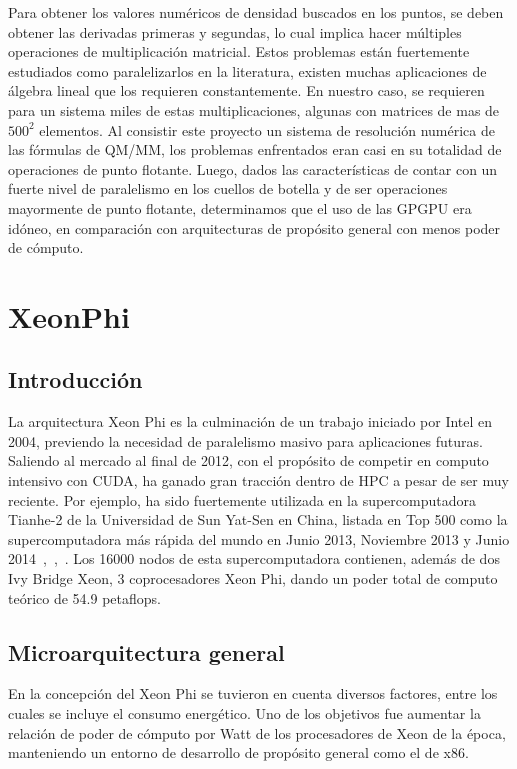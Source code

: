 Para obtener los valores num\'ericos de densidad buscados en los puntos, se deben obtener las derivadas primeras
y segundas, lo cual implica hacer m\'ultiples operaciones de multiplicaci\'on matricial. Estos problemas est\'an
fuertemente estudiados como paralelizarlos en la literatura, existen muchas aplicaciones de \'algebra lineal que
los requieren constantemente.
En nuestro caso, se requieren para un sistema miles de estas multiplicaciones, algunas con matrices de mas de
$500^2$ elementos. Al consistir este proyecto un sistema de resoluci\'on num\'erica de las f\'ormulas de QM/MM,
los problemas enfrentados eran casi en su totalidad de operaciones de punto flotante. Luego, dados las
caracter\'isticas de contar con un fuerte nivel de paralelismo en los cuellos de botella y de ser operaciones
mayormente de punto flotante, determinamos que el uso de las GPGPU era id\'oneo, en comparaci\'on con arquitecturas
de prop\'osito general con menos poder de c\'omputo.


\section{XeonPhi}

\subsection{Introducci\'on}

La arquitectura Xeon Phi es la culminaci\'on de un trabajo iniciado por Intel en 2004, previendo
la necesidad de paralelismo masivo para aplicaciones futuras. Saliendo al mercado al final de 2012,
con el prop\'osito de competir en computo intensivo con \nvidia{} CUDA, ha ganado gran tracci\'on dentro
de HPC a pesar de ser muy reciente. Por ejemplo, ha sido fuertemente utilizada en la supercomputadora Tianhe-2
de la Universidad de Sun Yat-Sen en China, listada en Top 500 como la supercomputadora m\'as r\'apida del
mundo en Junio 2013, Noviembre 2013 y Junio 2014~\cite{Top500XeonPhiJune2013},~\cite{Top500XeonPhiNov2013},~\cite{Top500XeonPhiJune2014}.
Los 16000 nodos de esta supercomputadora contienen, adem\'as de dos Ivy Bridge Xeon, 3 coprocesadores
Xeon Phi, dando un poder total de computo te\'orico de 54.9 petaflops.

\subsection{Microarquitectura general}

En la concepci\'on del Xeon Phi se tuvieron en cuenta diversos factores, entre los cuales
se incluye el consumo energ\'etico. Uno de los objetivos fue aumentar la relaci\'on de
poder de c\'omputo por Watt de los procesadores de Xeon de la \'epoca, manteniendo un entorno
de desarrollo de prop\'osito general como el de x86.

